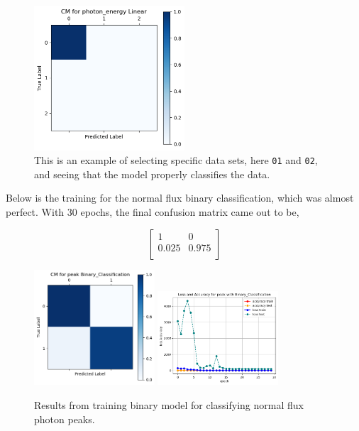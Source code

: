 \documentclass[12pt]{article}
\begin{document}
\begin{figure}[H]
    \centering
    \includegraphics[width=0.5\textwidth]{confusion_matrix/photon_energy_example_cm.png}
    \caption{This is an example of selecting specific data sets, here \texttt{01} and \texttt{02}, and seeing that the model properly classifies the data.}
    \label{fig:photon_energy_example}
\end{figure}

Below is the training for the normal flux binary classification, which was almost perfect. With 30 epochs, the final confusion matrix came out to be,

\[
    \begin{bmatrix}
        1 & 0\\
        0.025 & 0.975\\
    \end{bmatrix}
\]

\begin{figure}[H]
    \centering
    \includegraphics[width=0.4\textwidth]{confusion_matrix/binary_cm.png}
    \includegraphics[width=0.4\textwidth]{loss_plot/binary_loss.png}
    \caption{Results from training binary model for classifying normal flux photon peaks.}
    \label{fig:binary}
\end{figure}
\end{document}
